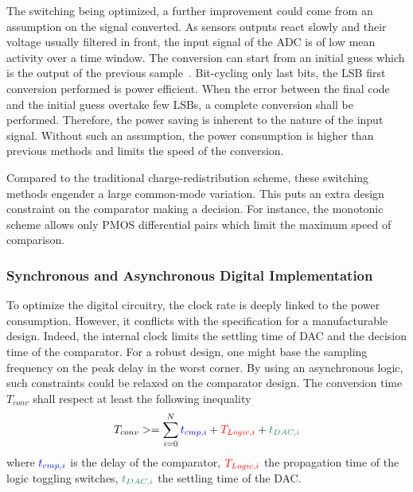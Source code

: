 The switching being optimized, a further improvement could come from an assumption on the signal converted. As sensors outputs react slowly and their voltage usually filtered in front, the input signal of the ADC is of low mean activity over a time window. The conversion can start from an initial guess which is the output of the previous sample~\cite{Yaul2014}. Bit-cycling only last bits, the LSB first conversion performed is power efficient. When the error between the final code and the initial guess overtake few LSBs, a complete conversion shall be performed. Therefore, the power saving is inherent to the nature of the input signal. Without such an assumption, the power consumption is higher than previous methods and limits the speed of the conversion.

Compared to the traditional charge-redistribution scheme, these switching methods engender a large common-mode variation. This puts an extra design constraint on the comparator making a decision. For instance, the monotonic scheme allows only PMOS differential pairs which limit the maximum speed of comparison.

\subsubsection{Synchronous and Asynchronous Digital Implementation}
To optimize the digital circuitry, the clock rate is deeply linked to the power consumption. However, it conflicts with the specification for a manufacturable design. Indeed, the internal clock limits the settling time of DAC and the decision time of the comparator. For a robust design, one might base the sampling frequency on the peak delay in the worst corner. By using an asynchronous logic, such constraints could be relaxed on the comparator design. The conversion time \(T_{conv}  \) shall respect at least the following inequality
\begin{equation}
\label{eqn:sar_async_conv}
T_{conv} >= \sum_{i=0}^N {\textcolor{blue}{t_{cmp, i}}+\textcolor{red}{T_{Logic, i}}+\textcolor{Xgreen}{t_{DAC, i}}}
\end{equation}
where \(\textcolor{blue}{t_{cmp, i}}\) is the delay of the comparator, \(\textcolor{red}{T_{Logic, i}}\) the propagation time of the logic toggling switches, \(\textcolor{Xgreen}{t_{DAC, i}}\) the settling time of the DAC\@.

